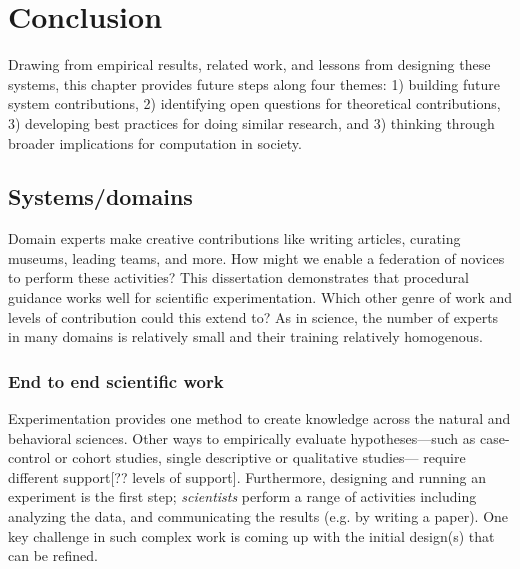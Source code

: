 
\chapter{Conclusion}
Drawing from empirical results, related work, and lessons from designing these systems, this chapter provides future steps along four themes: 1) building future system contributions, 2) identifying open questions for theoretical contributions, 3) developing best practices for doing similar research, and 3) thinking through broader implications for computation in society.

\section{Systems/domains} 

Domain experts make creative contributions like writing articles, curating museums, leading teams, and more. How might we enable a federation of novices to perform these activities? This dissertation demonstrates that procedural guidance works well for scientific experimentation. Which other genre of work and levels of contribution could this extend to? As in science, the number of experts in many domains is relatively small and their training relatively homogenous. 

\subsection{End to end scientific work}
Experimentation provides one method to create knowledge across the natural and behavioral sciences. Other ways to empirically evaluate hypotheses---such as case-control or cohort studies, single descriptive or qualitative studies--- require different support[?? levels of support]. Furthermore, designing and running an experiment is the first step; \textit{scientists} perform a range of activities including analyzing the data, and communicating the results (e.g. by writing a paper). One key challenge in such complex work is coming up with the initial design(s) that can be refined. 

